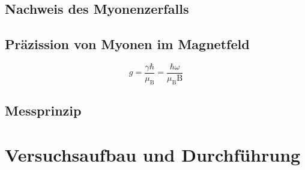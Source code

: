 \documentclass[a4paper,ngerman]{scrartcl}
\begin{document}



\subsection{Nachweis des Myonenzerfalls}
\label{sec:nachweis}


\subsection{Präzission von Myonen im Magnetfeld}
\label{sec:prazission}
\begin{equation}
g = \frac{\gamma \hbar}{\mu_\mathrm{B}} = \frac{\hbar \omega}{\mu_\mathrm{B}\mathrm{B}}
\end{equation}

\subsection{Messprinzip}
\label{sec:messprinzip}
\clearpage

\section{Versuchsaufbau und Durchführung}
\end{document}
